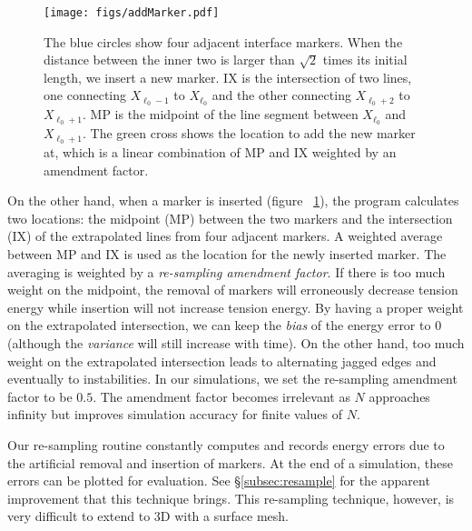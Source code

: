 \documentclass{jfm}
\begin{document}
\begin{figure}
    \centering
    \texttt{[image: figs/addMarker.pdf]}
    \caption{
        The blue circles show four adjacent interface markers. When the distance between the inner two is larger than $\sqrt{2}$ times its initial length, we insert a new marker. IX is the intersection of two lines, one connecting $X_{\ell_0-1}$ to $X_{\ell_0}$ and the other connecting $X_{\ell_0+2}$ to $X_{\ell_0+1}$. MP is the midpoint of the line segment between $X_{\ell_0}$ and $X_{\ell_0+1}$. The green cross shows the location to add the new marker at, which is a linear combination of MP and IX weighted by an amendment factor. 
    }
    \label{fig:add-marker}
\end{figure}
On the other hand, when a marker is inserted (figure ~\ref{fig:add-marker}), the program calculates two locations: the midpoint (MP) between the two markers and the intersection (IX) of the extrapolated lines from four adjacent markers. A weighted average between MP and IX is used as the location for the newly inserted marker. The averaging is weighted by a \textit{re-sampling amendment factor}. If there is too much weight on the midpoint, the removal of markers will erroneously decrease tension energy while insertion will not increase tension energy. By having a proper weight on the extrapolated intersection, we can keep the \textit{bias} of the energy error to $0$ (although the \textit{variance} will still increase with time). On the other hand, too much weight on the extrapolated intersection leads to alternating jagged edges and eventually to instabilities. In our simulations, we set the re-sampling amendment factor to be $0.5$. The amendment factor becomes irrelevant as $N$ approaches infinity but improves simulation accuracy for finite values of $N$.

Our re-sampling routine constantly computes and records energy errors due to the artificial removal and insertion of markers. At the end of a simulation, these errors can be plotted for evaluation. See \S\ref{subsec:resample} for the apparent improvement that this technique brings. This re-sampling technique, however, is very difficult to extend to 3D with a surface mesh.  
\end{document}
